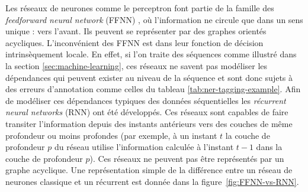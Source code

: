 \documentclass[12pt,a4paper,times,twoside,openright]{report}
\begin{document}
Les réseaux de neurones comme le perceptron font partie de la famille des \emph{feedforward neural network} (FFNN) \citep{rosenblatt1958perceptron,svozil1997introduction}, où l'information ne circule que dans un sens unique : vers l'avant. Ils peuvent se représenter par des graphes orientés acycliques.
L'inconvénient des FFNN est dans leur fonction de décision intrinsèquement locale. En effet, si l'on traite des séquences comme illustré dans la section \ref{sec:machine-learning}, ces réseaux ne savent pas modéliser les dépendances qui peuvent exister au niveau de la séquence et sont donc sujets à des erreurs d'annotation comme celles du tableau \ref{tab:ner-tagging-example}.
Afin de modéliser ces dépendances typiques des données séquentielles les \emph{récurrent neural networks} (RNN) \citep{elman1990finding,mandic2001recurrent} ont été développés. Ces réseaux sont capables de faire transiter l'information depuis des instants antérieurs vers des couches de même profondeur ou moins profondes (par exemple, à un instant $t$ la couche de profondeur $p$ du réseau utilise l'information calculée à l'instant $t-1$ dans la couche de profondeur $p$). Ces réseaux ne peuvent pas être représentés par un graphe acyclique. Une représentation simple de la différence entre un réseau de neurones classique et un récurrent est donnée dans la figure\ \ref{fig:FFNN-vs-RNN}.
\end{document}
